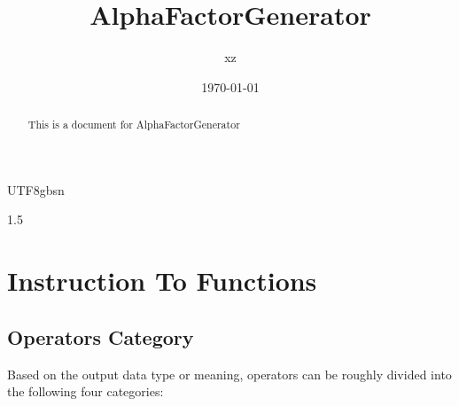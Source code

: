 \documentclass{article}
\begin{document}
\begin{CJK}{UTF8}{gbsn}
\begin{spacing}{1.5}
\title{AlphaFactorGenerator}  %
\author{xz}  %
\date{\today}    %
\maketitle     %
\begin{abstract}         %
\small \centering This is a document for AlphaFactorGenerator
\end{abstract}
  \setcounter{tocdepth}{2}
\tableofcontents  %


%
%



\section{Instruction To Functions}

\subsection{Operators Category}

Based on the output data type or meaning, operators can be roughly divided into the following four categories:\\



\end{spacing}
\end{CJK}
\end{document}
